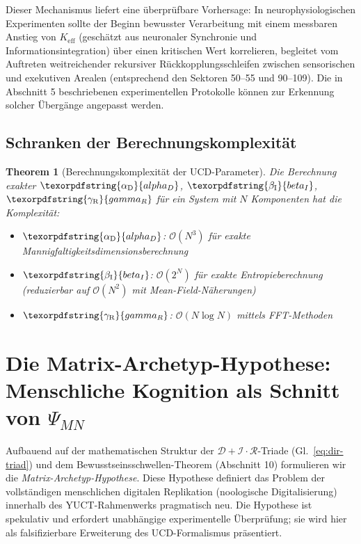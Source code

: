 \documentclass[12pt,a4paper]{article}
\newtheorem{theorem}{Theorem}
\DeclareRobustCommand{\alD}{\texorpdfstring{\ensuremath{\alpha_{\mathrm{D}}}}{alpha_D}}
\DeclareRobustCommand{\beI}{\texorpdfstring{\ensuremath{\beta_{\mathrm{I}}}}{beta_I}}
\DeclareRobustCommand{\gaR}{\texorpdfstring{\ensuremath{\gamma_{\mathrm{R}}}}{gamma_R}}
\newcommand{\eff}{\mathrm{eff}}
\begin{document}
	Dieser Mechanismus liefert eine überprüfbare Vorhersage: In neurophysiologischen Experimenten sollte der Beginn bewusster Verarbeitung mit einem messbaren Anstieg von \(K_{\eff}\) (geschätzt aus neuronaler Synchronie und Informationsintegration) über einen kritischen Wert korrelieren, begleitet vom Auftreten weitreichender rekursiver Rückkopplungsschleifen zwischen sensorischen und exekutiven Arealen (entsprechend den Sektoren 50--55 und 90--109). Die in Abschnitt 5 beschriebenen experimentellen Protokolle können zur Erkennung solcher Übergänge angepasst werden.
	
	\subsection{Schranken der Berechnungskomplexität}
	
	\begin{theorem}[Berechnungskomplexität der UCD-Parameter]
		Die Berechnung exakter \(\alD\), \(\beI\), \(\gaR\) für ein System mit \(N\) Komponenten hat die Komplexität:
		\begin{itemize}
			\item \(\alD\): \(\mathcal{O}(N^3)\) für exakte Mannigfaltigkeitsdimensionsberechnung
			\item \(\beI\): \(\mathcal{O}(2^N)\) für exakte Entropieberechnung (reduzierbar auf \(\mathcal{O}(N^2)\) mit Mean-Field-Näherungen)
			\item \(\gaR\): \(\mathcal{O}(N \log N)\) mittels FFT-Methoden
		\end{itemize}
	\end{theorem}
	
	\section{Die Matrix-Archetyp-Hypothese: Menschliche Kognition als Schnitt von \(\Psi_{MN}\)}
	\label{sec:matrix}
	
	Aufbauend auf der mathematischen Struktur der \(\mathcal{D}+\mathcal{I}\cdot\mathcal{R}\)-Triade (Gl.~\ref{eq:dir-triad}) und dem Bewusstseinsschwellen-Theorem (Abschnitt 10) formulieren wir die \textit{Matrix-Archetyp-Hypothese}. Diese Hypothese definiert das Problem der vollständigen menschlichen digitalen Replikation (noologische Digitalisierung) innerhalb des YUCT-Rahmenwerks pragmatisch neu. Die Hypothese ist spekulativ und erfordert unabhängige experimentelle Überprüfung; sie wird hier als falsifizierbare Erweiterung des UCD-Formalismus präsentiert.
	
\end{document}
